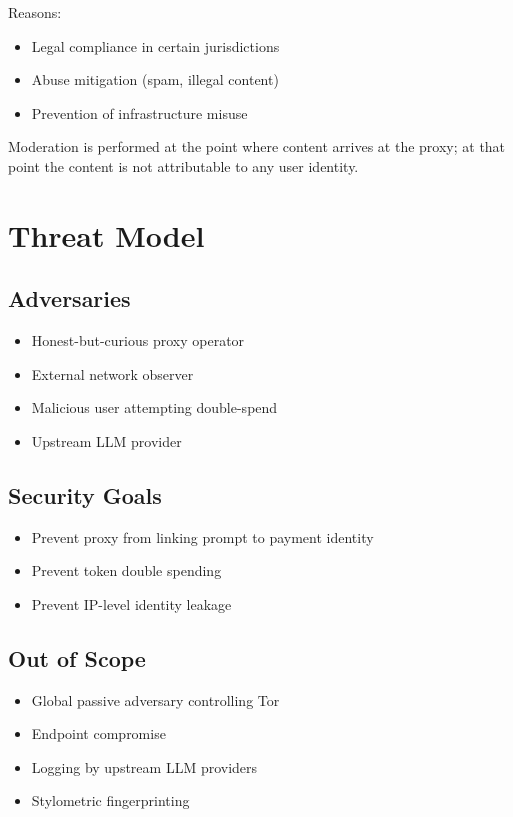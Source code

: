 \documentclass[11pt,a4paper]{article}
\begin{document}
Reasons:
\begin{itemize}
  \item Legal compliance in certain jurisdictions
  \item Abuse mitigation (spam, illegal content)
  \item Prevention of infrastructure misuse
\end{itemize}

Moderation is performed at the point where content arrives at the proxy; at that point the content is not
attributable to any user identity.

\section{Threat Model}

\subsection{Adversaries}

\begin{itemize}
  \item Honest-but-curious proxy operator
  \item External network observer
  \item Malicious user attempting double-spend
  \item Upstream LLM provider
\end{itemize}

\subsection{Security Goals}

\begin{itemize}
  \item Prevent proxy from linking prompt to payment identity
  \item Prevent token double spending
  \item Prevent IP-level identity leakage
\end{itemize}

\subsection{Out of Scope}

\begin{itemize}
  \item Global passive adversary controlling Tor
  \item Endpoint compromise
  \item Logging by upstream LLM providers
  \item Stylometric fingerprinting
\end{itemize}
\end{document}
